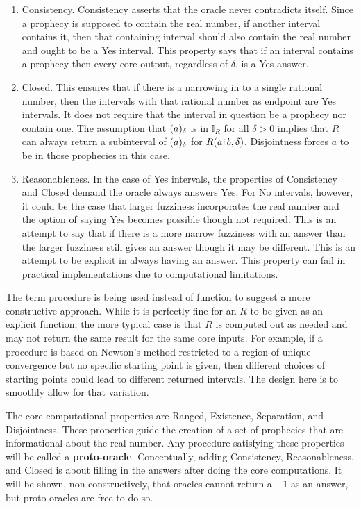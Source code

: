 \documentclass[12pt]{article}
\begin{document}
\begin{enumerate}
    \item Consistency. Consistency asserts that the oracle never contradicts itself. Since a prophecy is supposed to contain the real number, if another interval contains it, then that containing interval should also contain the real number and ought to be a Yes interval. This property says that if an interval contains a prophecy then every core output, regardless of $\delta$, is a Yes answer. 

    
    \item Closed. This ensures that if there is a narrowing in to a single rational number, then the intervals with that rational number as endpoint are Yes intervals. It does not require that the interval in question be a prophecy nor contain one. The assumption that $(a)_{\delta}$ is in $\mathbb{I}_R$ for all $\delta >0$ implies that $R$ can always return a subinterval of $(a)_{\delta}$ for $R(a\rint b, \delta)$. Disjointness forces $a$ to be in those prophecies in this case. 


    \item Reasonableness. In the case of Yes intervals, the properties of Consistency and Closed demand the oracle always answers Yes. For No intervals, however, it could be the case that larger fuzziness incorporates the real number and the option of saying Yes becomes possible though not required. This is an attempt to say that if there is a more narrow fuzziness with an answer than the larger fuzziness still gives an answer though it may be different. This is an attempt to be explicit in always having an answer. This property can fail in practical implementations due to computational limitations. 

\end{enumerate}

The term procedure is being used instead of function to suggest a more constructive approach. While it is perfectly fine for an $R$ to be given as an explicit function, the more typical case is that $R$ is computed out as needed and may not return the same result for the same core inputs. For example, if a procedure is based on Newton's method restricted to a region of unique convergence but no specific starting point is given, then different choices of starting points could lead to different returned intervals. The design here is to smoothly allow for that variation. 

The core computational properties are Ranged, Existence, Separation, and Disjointness. These properties guide the creation of a set of prophecies that are informational about the real number. Any procedure satisfying these properties will be called a \textbf{proto-oracle}. Conceptually, adding Consistency, Reasonableness, and Closed is about filling in the answers after doing the core computations. It will be shown, non-constructively, that oracles cannot return a $-1$ as an answer, but proto-oracles are free to do so. 
\end{document}
